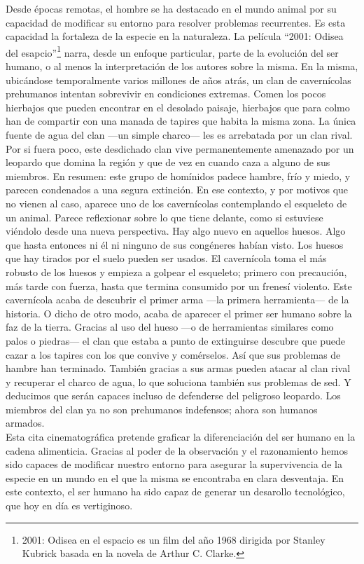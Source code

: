 Desde épocas remotas, el hombre se ha destacado en el mundo animal por su capacidad de modificar su entorno para resolver problemas recurrentes. Es esta capacidad la fortaleza de la especie en la naturaleza. La película ``2001: Odisea del esapcio''\footnote{2001: Odisea en el espacio es un film del año 1968 dirigida por Stanley Kubrick basada en la novela de Arthur C. Clarke.} narra, desde un enfoque particular, parte de la evolución del ser humano, o al menos la interpretación de los autores sobre la misma. En la misma, ubicándose temporalmente varios millones de años atrás, un clan de cavernícolas prehumanos intentan sobrevivir en condiciones extremas. Comen los pocos hierbajos que pueden encontrar en el desolado paisaje, hierbajos que para colmo han de compartir con una manada de tapires que habita la misma zona. La única fuente de agua del clan —un simple charco— les es arrebatada por un clan rival. Por si fuera poco, este desdichado clan vive permanentemente amenazado por un leopardo que domina la región y que de vez en cuando caza a alguno de sus miembros. En resumen: este grupo de homínidos padece hambre, frío y miedo, y parecen condenados a una segura extinción. En ese contexto, y por motivos que no vienen al caso, aparece uno de los cavernícolas contemplando el esqueleto de un animal. Parece reflexionar sobre lo que tiene delante, como si estuviese viéndolo desde una nueva perspectiva. Hay algo nuevo en aquellos huesos. Algo que hasta entonces ni él ni ninguno de sus congéneres habían visto. Los huesos que hay tirados por el suelo pueden ser usados. El cavernícola toma el más robusto de los huesos y empieza a golpear el esqueleto; primero con precaución, más tarde con fuerza, hasta que termina consumido por un frenesí violento. Este cavernícola acaba de descubrir el primer arma —la primera herramienta— de la historia. O dicho de otro modo, acaba de aparecer el primer ser humano sobre la faz de la tierra. Gracias al uso del hueso —o de herramientas similares como palos o piedras— el clan que estaba a punto de extinguirse descubre que puede cazar a los tapires con los que convive y comérselos. Así que sus problemas de hambre han terminado. También gracias a sus armas pueden atacar al clan rival y recuperar el charco de agua, lo que soluciona también sus problemas de sed. Y deducimos que serán capaces incluso de defenderse del peligroso leopardo. Los miembros del clan ya no son prehumanos indefensos; ahora son humanos armados.\\
Esta cita cinematográfica pretende graficar la diferenciación del ser humano en la cadena alimenticia. Gracias al poder de la observación y el razonamiento hemos sido capaces de modificar nuestro entorno para asegurar la supervivencia de la especie en un mundo en el que la misma se encontraba en clara desventaja. En este contexto, el ser humano ha sido capaz de generar un desarollo tecnológico, que hoy en día es vertiginoso.\\

